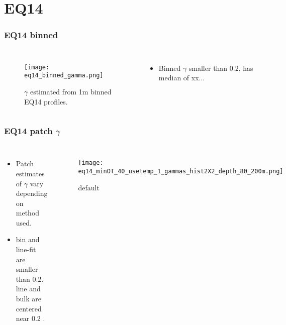 \documentclass{beamer}
\begin{document}
\section{EQ14}

\begin{frame}
 \frametitle{EQ14 binned}


\begin{columns}
\begin{figure}[htbp]
\begin{center}
\texttt{[image: eq14\_binned\_gamma.png]}
\caption{$\gamma$ estimated from 1m binned EQ14 profiles.}
\label{default}
\end{center}
\end{figure}

\begin{itemize}
\item Binned $\gamma$ smaller than 0.2, has median of xx...
\end{itemize}

\end{columns}

\end{frame}


\begin{frame}
 \frametitle{EQ14 patch $\gamma$}


\begin{columns}
\begin{itemize}
\item Patch estimates of $\gamma$ vary depending on method used.
\item bin and line-fit are smaller than 0.2. line and bulk are centered near 0.2 .
\end{itemize}

\begin{figure}[htbp]
\begin{center}
\texttt{[image: eq14\_minOT\_40\_usetemp\_1\_gammas\_hist2X2\_depth\_80\_200m.png]}
\caption{default}
\label{default}
\end{center}
\end{figure}

\end{columns}



\end{frame}
\end{document}
